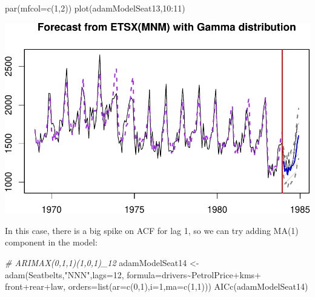 \documentclass[
]{book}
\newenvironment{Shaded}{\begin{snugshade}}{\end{snugshade}}
\newcommand{\AttributeTok}[1]{\textcolor[rgb]{0.77,0.63,0.00}{#1}}
\newcommand{\CommentTok}[1]{\textcolor[rgb]{0.56,0.35,0.01}{\textit{#1}}}
\newcommand{\DecValTok}[1]{\textcolor[rgb]{0.00,0.00,0.81}{#1}}
\newcommand{\FunctionTok}[1]{\textcolor[rgb]{0.00,0.00,0.00}{#1}}
\newcommand{\NormalTok}[1]{#1}
\newcommand{\OtherTok}[1]{\textcolor[rgb]{0.56,0.35,0.01}{#1}}
\newcommand{\SpecialCharTok}[1]{\textcolor[rgb]{0.00,0.00,0.00}{#1}}
\newcommand{\StringTok}[1]{\textcolor[rgb]{0.31,0.60,0.02}{#1}}
\theoremstyle{definition}
\theoremstyle{definition}
\theoremstyle{definition}
\theoremstyle{definition}
\theoremstyle{remark}
\begin{document}
\begin{Shaded}
\begin{Highlighting}[]
\FunctionTok{par}\NormalTok{(}\AttributeTok{mfcol=}\FunctionTok{c}\NormalTok{(}\DecValTok{1}\NormalTok{,}\DecValTok{2}\NormalTok{))}
\FunctionTok{plot}\NormalTok{(adamModelSeat13,}\DecValTok{10}\SpecialCharTok{:}\DecValTok{11}\NormalTok{)}
\end{Highlighting}
\end{Shaded}

\includegraphics{adam_files/figure-latex/unnamed-chunk-151-1.pdf}

In this case, there is a big spike on ACF for lag 1, so we can try adding MA(1) component in the model:

\begin{Shaded}
\begin{Highlighting}[]
\CommentTok{\# ARIMAX(0,1,1)(1,0,1)\_12}
\NormalTok{adamModelSeat14 }\OtherTok{\textless{}{-}} \FunctionTok{adam}\NormalTok{(Seatbelts,}\StringTok{"NNN"}\NormalTok{,}\AttributeTok{lags=}\DecValTok{12}\NormalTok{,}
                        \AttributeTok{formula=}\NormalTok{drivers}\SpecialCharTok{\textasciitilde{}}\NormalTok{PetrolPrice}\SpecialCharTok{+}\NormalTok{kms}\SpecialCharTok{+}
\NormalTok{                          front}\SpecialCharTok{+}\NormalTok{rear}\SpecialCharTok{+}\NormalTok{law,}
                        \AttributeTok{orders=}\FunctionTok{list}\NormalTok{(}\AttributeTok{ar=}\FunctionTok{c}\NormalTok{(}\DecValTok{0}\NormalTok{,}\DecValTok{1}\NormalTok{),}\AttributeTok{i=}\DecValTok{1}\NormalTok{,}\AttributeTok{ma=}\FunctionTok{c}\NormalTok{(}\DecValTok{1}\NormalTok{,}\DecValTok{1}\NormalTok{)))}
\FunctionTok{AICc}\NormalTok{(adamModelSeat14)}
\end{Highlighting}
\end{Shaded}
\end{document}
